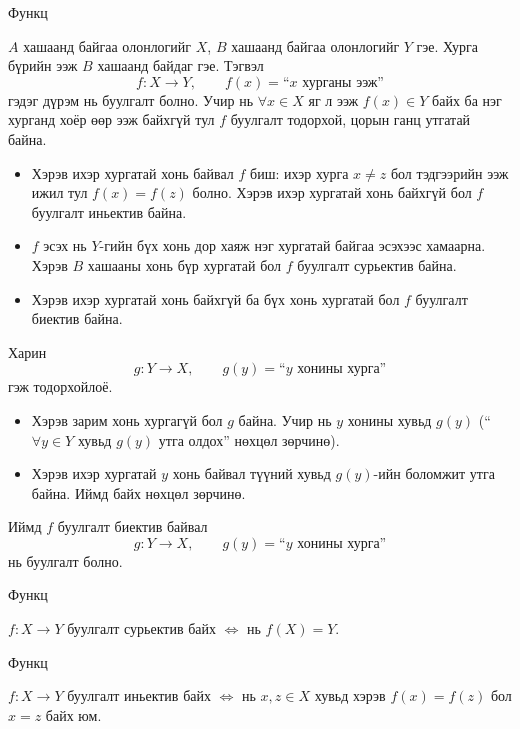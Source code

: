 \begin{frame}[allowframebreaks]{Функц}
\begin{example} $A$ хашаанд байгаа  олонлогийг $X$, $B$  хашаанд байгаа  олонлогийг $Y$ гэе. Хурга бүрийн ээж $B$ хашаанд байдаг гэе. Тэгвэл
\[
f:X\to Y,\qquad f(x)=\text{``$x$ хурганы ээж''}
\]
гэдэг дүрэм нь буулгалт болно. Учир нь $\forall x\in X$ яг  л ээж $f(x)\in Y$ байх ба  нэг хурганд хоёр өөр ээж байхгүй тул $f$  буулгалт тодорхой, цорын ганц утгатай байна.

\begin{itemize}
  \item Хэрэв ихэр хургатай хонь байвал $f$  биш: ихэр хурга $x\neq z$ бол тэдгээрийн ээж ижил тул $f(x)=f(z)$ болно. Хэрэв ихэр хургатай хонь байхгүй бол $f$ буулгалт иньектив байна.
  \item $f$  эсэх нь $Y$-гийн бүх хонь дор хаяж нэг хургатай байгаа эсэхээс хамаарна. Хэрэв $B$ хашааны хонь бүр хургатай бол $f$ буулгалт сурьектив байна.
  \item Хэрэв ихэр хургатай хонь байхгүй ба бүх хонь хургатай бол $f$ буулгалт биектив байна.
\end{itemize}

Харин
\[
g:Y\to X,\qquad g(y)=\text{``$y$ хонины хурга''}
\]
гэж тодорхойлоё. 
\begin{itemize}
  \item Хэрэв зарим хонь хургагүй бол $g$  байна. Учир нь $y$ хонины хувьд $g(y)$  (``\,$\forall y\in Y$ хувьд $g(y)$ утга олдох'' нөхцөл зөрчинө).
  \item Хэрэв ихэр хургатай $y$ хонь байвал түүний хувьд $g(y)$-ийн  боломжит утга байна. Иймд  байх нөхцөл зөрчинө.
\end{itemize}
Иймд $f$ буулгалт биектив байвал 
\[
g:Y\to X,\qquad g(y)=\text{``$y$ хонины хурга''}
\]  нь буулгалт болно.
\end{example}
\end{frame}

\begin{frame}[allowframebreaks]{Функц}
\begin{theorem}\label{fun:surj}
$f:X\to Y$ буулгалт сурьектив байх $\Longleftrightarrow$ нь $f(X)=Y$.
\end{theorem}
\end{frame}

\begin{frame}[allowframebreaks]{Функц}
\begin{theorem}\label{fun:inj}
$f:X\to Y$ буулгалт иньектив байх $\Longleftrightarrow$ нь $ x , z\in X$ хувьд хэрэв $f(x)=f(z)$ бол $x=z$ байх юм.
\end{theorem}
\end{frame}

